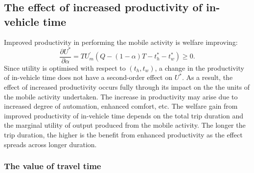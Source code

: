 \documentclass[12pt,a4paper,british]{article}
\begin{document}
\subsection*{The effect of increased productivity of in-vehicle time}

Improved productivity in performing the mobile activity is welfare improving:%
\begin{equation*}
    \frac{\partial U^{\ast}}{\partial \alpha} = T U^{\prime}_m\left( Q-\left(1-\alpha\right)T-t_{h}^{\ast}-t_{w}^{\ast} \right) \geq 0.
\end{equation*}
Since utility is optimised with respect to $\left(t_{h},t_{w}\right)$, a change in the productivity of in-vehicle time does not have a second-order effect on $U^{\ast}$. As a result, the effect of increased productivity occurs fully through its impact on the the units of the mobile activity undertaken. The increase in productivity may arise due to increased degree of automation, enhanced comfort, etc. The welfare gain from improved productivity of in-vehicle time depends on the total trip duration and the marginal utility of output produced from the mobile activity. The longer the trip duration, the higher is the benefit from enhanced productivity as the effect spreads across longer duration.


\subsubsection*{The value of travel time}

\end{document}
